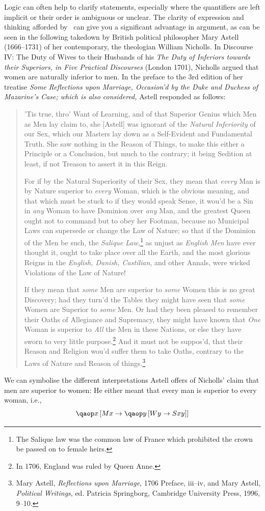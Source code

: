 \documentclass[PHIL101-Textbook.tex]{subfiles}
\begin{document}
Logic can often help to clarify statements, especially where the quantifiers are left implicit or their order is ambiguous or unclear. The clarity of expression and thinking afforded by \pl\ can give you a significant advantage in argument, as can be seen in the following takedown by British political philosopher Mary Astell (1666--1731) of her contemporary, the theologian William Nicholls. In Discourse IV: The Duty of Wives to their Husbands of his \textit{The Duty of Inferiors towards their Superiors, in Five Practical Discourses} (London 1701), Nicholls argued that women are naturally inferior to men. In the preface to the 3rd edition of her treatise \emph{Some Reflections upon Marriage, Occasion'd by the Duke and Duchess of Mazarine's Case; which is also considered,} Astell responded as follows:
\begin{quotation}
'Tis true, thro' Want of Learning, and of that Superior Genius which Men as Men lay claim to, she [Astell] was ignorant of the \textit{Natural Inferiority} of our Sex, which our Masters lay down as a Self-Evident and Fundamental Truth. She saw nothing in the Reason of Things, to make this either a Principle or a Conclusion, but much to the contrary; it being Sedition at least, if not Treason to assert it in this Reign. 

For if by the Natural Superiority of their Sex, they mean that \textit{every} Man is by Nature superior to \textit{every} Woman, which is the obvious meaning, and that which must be stuck to if they would speak Sense, it wou'd be a Sin in \textit{any} Woman to have Dominion over \textit{any} Man, and the greatest Queen ought not to command but to obey her Footman, because no Municipal Laws can supersede or change the Law of Nature; so that if the Dominion of the Men be such, the \textit{Salique Law,}\footnote{The Salique law was the common law of France which prohibited the crown be passed on to female heirs.} as unjust as \textit{English Men} have ever thought it, ought to take place over all the Earth, and the most glorious Reigns in the \textit{English, Danish, Castilian}, and other Annals, were wicked Violations of the Law of Nature!

If they mean that \textit{some} Men are superior to \textit{some} Women this is no great Discovery; had they turn'd the Tables they might have seen that \textit{some} Women are Superior to \textit{some} Men. Or had they been pleased to remember their Oaths of Allegiance and Supremacy, they might have known that \textit{One} Woman is superior to \textit{All} the Men in these Nations, or else they have sworn to very little purpose.\footnote{In 1706, England was ruled by  Queen Anne.} And it must not be suppos'd, that their Reason and Religion wou'd suffer them to take Oaths, contrary to the Laws of Nature and Reason of things.\footnote{Mary Astell, \textit{Reflections upon Marriage}, 1706 Preface, iii--iv, and Mary Astell,
  \textit{Political Writings}, ed. Patricia Springborg, Cambridge   University Press, 1996, 9--10.}
\end{quotation}
We can symbolise the different interpretations Astell offers of Nicholls' claim that men are superior to women:
He either meant that every man is superior to every woman, i.e.,
$$\qab{x}{\atom M x  \eif \qab{y}{\atom W y \eif \atom S xy }}$$
\end{document}
